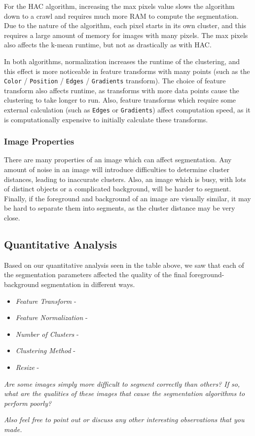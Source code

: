 \documentclass[12pt]{article}
\begin{document}
For the HAC algorithm, increasing the max pixels value slows the algorithm down to a crawl and requires much more RAM to compute the segmentation. Due to the nature of the algorithm, each pixel starts in its own cluster, and this requires a large amount of memory for images with many pixels. The max pixels also affects the k-mean runtime, but not as drastically as with HAC.

In both algorithms, normalization increases the runtime of the clustering, and this effect is more noticeable in feature transforms with many points (such as the \texttt{Color} / \texttt{Position} / \texttt{Edges} / \texttt{Gradients} transform). The choice of feature transform also affects runtime, as transforms with more data points cause the clustering to take longer to run. Also, feature transforms which require some external calculation (such as \texttt{Edges} or \texttt{Gradients}) affect computation speed, as it is computationally expensive to initially calculate these transforms.

\subsubsection{Image Properties}
	There are many properties of an image which can affect segmentation. Any amount of noise in an image will introduce difficulties to determine cluster distances, leading to inaccurate clusters. Also, an image which is busy, with lots of distinct objects or a complicated background, will be harder to segment. Finally, if the foreground and background of an image are visually similar, it may be hard to separate them into segments, as the cluster distance may be very close. 

\subsection{Quantitative Analysis}

Based on our quantitative analysis seen in the table above, we saw that each of the segmentation parameters affected the quality of the final foreground-background segmentation in different ways.

\begin{itemize}
	\item \textit{Feature Transform} - 
	\item \textit{Feature Normalization} -
	\item \textit{Number of Clusters} -
	\item \textit{Clustering Method} - 
	\item \textit{Resize} - 
\end{itemize}

\textit{Are some images simply more difficult to segment correctly than others? If
so, what are the qualities of these images that cause the segmentation
algorithms to perform poorly?}


\textit{Also feel free to point out or discuss any other interesting observations that
you made.}
\end{document}
